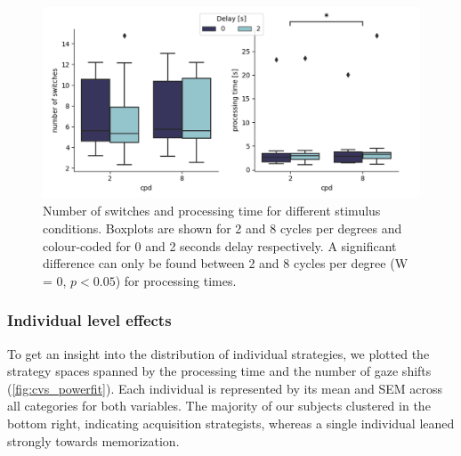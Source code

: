 \begin{figure}[H]
    \centering
    \includegraphics[width=\textwidth]{Figures/box_plots_shifts+proc_protocol.png}
    \caption[Switches and processing time]{Number of switches and processing time for different stimulus conditions. Boxplots are shown for 2 and 8 cycles per degrees and colour-coded for 0 and 2 seconds delay respectively. A significant difference can only be found between 2 and 8 cycles per degree (W = 0, $p<0.05$) for processing times.}
    \label{fig:boxplots2}
\end{figure}

\newpage
\subsubsection{Individual level effects}

To get an insight into the distribution of individual strategies, we plotted the strategy spaces spanned by the processing time and the number of gaze shifts (\ref{fig:cvs_powerfit}). Each individual is represented by its mean and SEM across all categories for both variables. The majority of our subjects clustered in the bottom right, indicating acquisition strategists, whereas a single individual leaned strongly towards memorization.

